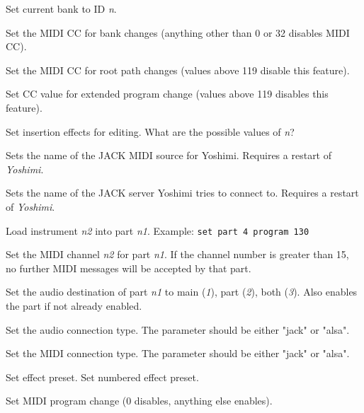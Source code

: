       Set current bank to ID \textsl{n}.

      Set the MIDI CC for bank changes (anything other than 0 or 32
      disables MIDI CC).

      Set the MIDI CC for root path changes (values above 119 disable this
      feature).

      Set CC value for extended program change (values above 119 disables this
      feature).

      Set insertion effects for editing.
      What are the possible values of \textsl{n}?

      Sets the name of the JACK MIDI source for Yoshimi.
      Requires a restart of \textsl{Yoshimi}.

      Sets the name of the JACK server Yoshimi tries to connect to.
      Requires a restart of \textsl{Yoshimi}.

      Load instrument \textsl{n2} into part \textsl{n1}.
      Example: \texttt{set part 4 program 130}

      Set the MIDI channel \textsl{n2} for part \textsl{n1}.
      If the channel number is greater than 15, no further MIDI
      messages will be accepted by that part.

      Set the audio destination of part \textsl{n1}
      to main (\textsl{1}), part (\textsl{2}), both (\textsl{3}).
      Also enables the part if not already enabled.

      Set the audio connection type.
      The parameter should be either "jack" or "alsa".

      Set the MIDI connection type.
      The parameter should be either "jack" or "alsa".

      Set effect preset.
      Set numbered effect preset.

      Set MIDI program change (0 disables, anything else enables).

